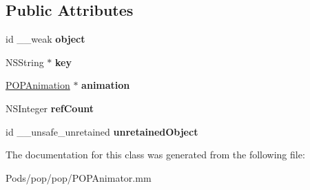 \subsection*{Public Attributes}
\begin{DoxyCompactItemize}
\item 
\mbox{\label{class_p_o_p_animator_item_a6a23f3bd3f07489ede6ff49466ed64df}} 
id \+\_\+\+\_\+weak {\bfseries object}
\item 
\mbox{\label{class_p_o_p_animator_item_aef87654d2d2650cb11473e44214dcc0c}} 
N\+S\+String $\ast$ {\bfseries key}
\item 
\mbox{\label{class_p_o_p_animator_item_a6aa79ebbeedb3007cf9507c357af19c8}} 
\mbox{\hyperlink{interface_p_o_p_animation}{P\+O\+P\+Animation}} $\ast$ {\bfseries animation}
\item 
\mbox{\label{class_p_o_p_animator_item_a4139dcb42ab3aa6776387ce78f6fcb5c}} 
N\+S\+Integer {\bfseries ref\+Count}
\item 
\mbox{\label{class_p_o_p_animator_item_af4e6f141212de053d8c06b6176dde600}} 
id \+\_\+\+\_\+unsafe\+\_\+unretained {\bfseries unretained\+Object}
\end{DoxyCompactItemize}


The documentation for this class was generated from the following file\+:\begin{DoxyCompactItemize}
\item 
Pods/pop/pop/P\+O\+P\+Animator.\+mm\end{DoxyCompactItemize}
